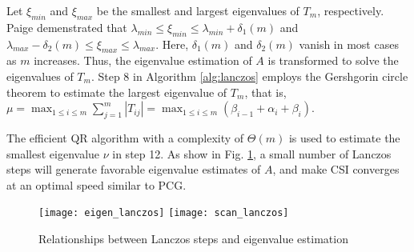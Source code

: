 Let $\xi_{min}$ and $\xi_{max}$ be the smallest and largest eigenvalues of $T_m$, respectively. Paige\cite{Paige1980235} demenstrated that
$\lambda_{min} \le \xi_{min} \le \lambda_{min}+\delta_1(m)$ and $\lambda_{max}-\delta_2(m)  \le \xi_{max} \le \lambda_{max}$.
Here, $\delta_1(m)$ and $\delta_2(m)$ vanish in most cases as $m$ increases. Thus, the eigenvalue estimation of $A$ is transformed to solve the eigenvalues of $T_m$. 
Step 8 in Algorithm  \ref{alg:lanczos} employs the Gershgorin circle theorem to estimate the largest eigenvalue of $T_m$, that is,
$\mu = \max_{1 \le i \le m}\sum^m_{j=1}|T_{ij}|=\max_{1 \le i \le m}(\beta_{i-1}+\alpha_i +\beta_{i})$.

The efficient QR algorithm \cite{ortega1963llt} with a complexity of $\Theta(m)$ is used to estimate the smallest eigenvalue $\nu$ in step 12. As show in Fig. \ref{fig:lanczos}, a small number of Lanczos steps will generate favorable eigenvalue estimates of $A$, and make CSI converges at an optimal speed similar to PCG. 
\begin {figure}%
\vspace{-20pt}
\centering
\texttt{[image: eigen\_lanczos]}
\texttt{[image: scan\_lanczos]}
\vspace{-10pt}
\caption[] {Relationships between Lanczos steps and eigenvalue estimation\label{fig:lanczos}}
\vspace{-20pt}
\end{figure}

